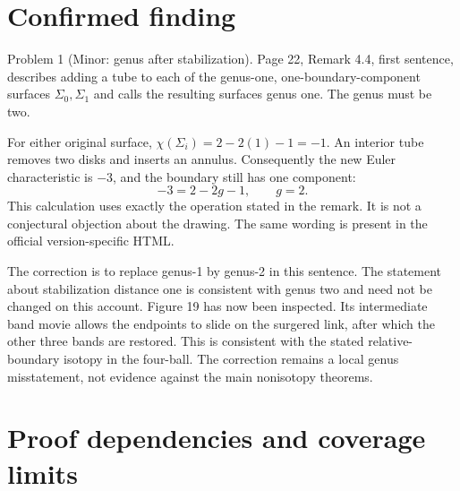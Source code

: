 \documentclass[10pt]{article}
\begin{document}
\section*{Confirmed finding}
Problem 1 (Minor: genus after stabilization).  Page 22, Remark 4.4, first sentence, describes adding a tube to each of the genus-one, one-boundary-component surfaces \(\Sigma_0,\Sigma_1\) and calls the resulting surfaces genus one. The genus must be two.\par
For either original surface, \(\chi(\Sigma_i)=2-2(1)-1=-1\). An interior tube removes two disks and inserts an annulus. Consequently the new Euler characteristic is \(-3\), and the boundary still has one component: \[-3=2-2g-1,\qquad g=2.\] This calculation uses exactly the operation stated in the remark. It is not a conjectural objection about the drawing. The same wording is present in the official version-specific HTML.\par
The correction is to replace genus-1 by genus-2 in this sentence. The statement about stabilization distance one is consistent with genus two and need not be changed on this account. Figure 19 has now been inspected. Its intermediate band movie allows the endpoints to slide on the surgered link, after which the other three bands are restored. This is consistent with the stated relative-boundary isotopy in the four-ball. The correction remains a local genus misstatement, not evidence against the main nonisotopy theorems.\par
\section*{Proof dependencies and coverage limits}
\end{document}
